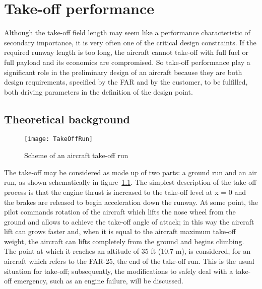 \chapter{Take-off performance}
Although the take-off field length may seem like a performance characteristic of secondary importance, it is very often one of the critical design constraints. If the required runway length is too long, the aircraft cannot take-off with full fuel or full payload and its economics are compromised.
%
So take-off performance play a significant role in the preliminary design of an aircraft because they are both design requirements, specified by the \gls{FAR} and by the customer, to be fulfilled, both driving parameters in the definition of the design point. 
%
\section{Theoretical background}
%
\begin{figure}[!b]
\centering
\texttt{[image: TakeOffRun]}
\caption{Scheme of an aircraft take-off run}
\label{fig:TOrun}
\end{figure}
%
The take-off may be considered as made up of two parts: a ground run and an air run, as shown schematically in figure~\ref{fig:TOrun}. The simplest description of the take-off process is that the engine thrust is increased to the take-off level at x = 0 and the brakes are released to begin acceleration down the runway. At some point, the pilot commands rotation of the aircraft which lifts the nose wheel from the ground and allows to achieve the take-off angle of attack; in this way the aircraft lift can grows faster and, when it is equal to the aircraft maximum take-off weight, the aircraft can lifts completely from the ground and begins climbing. The point at which it reaches an altitude of 35 \si{ft} (10.7 \si{\meter}), is considered, for an aircraft which refers to the \gls{FAR}-25, the end of the take-off run. 
%
This is the usual situation for take-off; subsequently, the modifications to safely deal with a take-off emergency, such as an engine failure, will be discussed.
%

